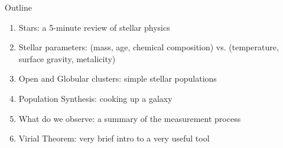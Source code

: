 \documentclass[letterpaper,landscape]{slides}
\begin{document}
%
%
%
%

\begin{slide}
	\begin{center}
		{\large \color{red} 
			Outline
		}
	\end{center}
	
	\begin{enumerate}
		\item {\color{blue} Stars:} a 5-minute review of stellar physics
		\item {\color{blue} Stellar parameters:} (mass, age, chemical composition) vs. 
		(temperature, surface gravity, metalicity)
		\item {\color{blue} Open and Globular clusters:} simple stellar populations 
		\item {\color{blue} Population Synthesis:} cooking up a galaxy
		\item {\color{blue} What do we observe:} a summary of the measurement process
		\item {\color{blue} Virial Theorem:} very brief intro to a very useful tool
	\end{enumerate}          
	\vfill
\end{slide}
\end{document}
